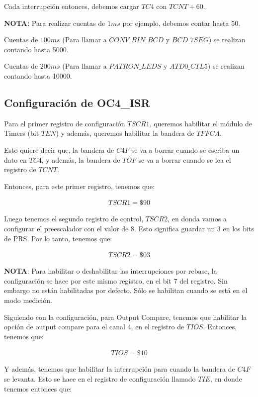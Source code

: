 \documentclass[12pt,letterpaper]{report} %
\begin{document}
Cada interrupción entonces, debemos cargar $TC4$ con $TCNT + 60$.

\textbf{NOTA:} Para realizar cuentas de $1ms$ por ejemplo, debemos contar hasta 50.

Cuentas de $100ms$ (Para llamar a $CONV\_BIN\_BCD$ y $BCD\_7SEG$) se realizan contando hasta 5000.

Cuentas de $200ms$ (Para llamar a $PATRON\_LEDS$ y $ATD0\_CTL5$) se realizan contando hasta 10000.


\subsection{Configuración de OC4\_ISR}

Para el primer registro de configuración $TSCR1$, queremos habilitar el módulo de Timers (bit $TEN$) y además, queremos habilitar la bandera de $TFFCA$. 

Esto quiere decir que, la bandera de $C4F$ se va a borrar cuando se escriba un dato en $TC4$, y además, la bandera de $TOF$ se va a borrar cuando se lea el registro de $TCNT$.

Entonces, para este primer registro, tenemos que:

\begin{align*}
    TSCR1 = \$90
\end{align*}

Luego tenemos el segundo registro de control, $TSCR2$, en donda vamos a configurar el preescalador con el valor de 8. Esto significa guardar un 3 en los bits de PRS. Por lo tanto, tenemos que:

\begin{align*}
    TSCR2 = \$03
\end{align*}

\textbf{NOTA}: Para habilitar o deshabilitar las interrupciones por rebase, la configuración se hace por este mismo registro, en el bit 7 del registro. Sin embargo no están habilitadas por defecto. Sólo se habilitan cuando se está en el modo medición.

Siguiendo con la configuración, para Output Compare, tenemos que habilitar la opción de output compare para el canal 4, en el registro de $TIOS$. Entonces, tenemos que:

\begin{align*}
    TIOS = \$10
\end{align*}

Y además, tenemos que habilitar la interrupción para cuando la bandera de $C4F$ se levanta. Esto se hace en el registro de configuración llamado $TIE$, en donde tenemos entonces que:
\end{document}
